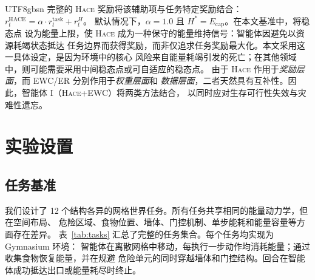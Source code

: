 \documentclass[sigplan,10pt]{acmart}
\newcommand{\setpoint}{H^*}
\newcommand{\energy}{E}
\newcommand{\reward}{r}
\newcommand{\hace}{\textsc{Hace}}
\begin{document}
\begin{CJK*}{UTF8}{gbsn}
完整的 \hace{} 奖励将该辅助项与任务特定奖励结合：
$\reward_t^{\text{HACE}} = \alpha \cdot \reward_t^{\text{task}} + \reward_t^H$。
默认情况下，$\alpha = 1.0$ 且 $\setpoint = \energy_{\text{cap}}$。在本文基准中，将稳态点
设为能量上限，使 \hace{} 成为一种保守的能量维持信号：智能体因避免以资源耗竭状态抵达
任务边界而获得奖励，而非仅追求任务奖励最大化。本文采用这一具体设定，是因为环境中的核心
风险来自能量耗竭引发的死亡；在其他领域中，则可能需要采用中间稳态点或可自适应的稳态点。
由于 \hace{} 作用于\emph{奖励层面}，而 EWC/ER 分别作用于\emph{权重层面}和
\emph{数据层面}，二者天然具有互补性。因此，智能体 I（\hace{}+EWC）将两类方法结合，
以同时应对生存可行性失效与灾难性遗忘。


\section{实验设置}
\label{sec:setup}

\subsection{任务基准}

我们设计了 12 个结构各异的网格世界任务。所有任务共享相同的能量动力学，但在空间布局、
危险区域、食物位置、墙体、门控机制、单步能耗和能量容量等方面存在差异。
表~\ref{tab:tasks} 汇总了完整的任务集合。每个任务均实现为 Gymnasium 环境：
智能体在离散网格中移动，每执行一步动作均消耗能量；通过收集食物恢复能量，并在规避
危险单元的同时穿越墙体和门控结构。回合在智能体成功抵达出口或能量耗尽时终止。


\end{CJK*}
\end{document}
